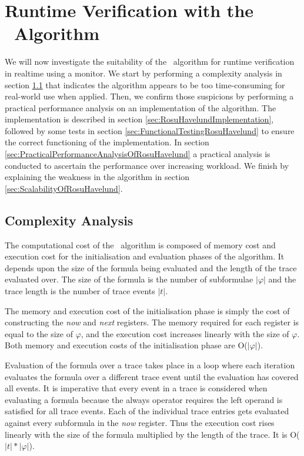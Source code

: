\chapter{Runtime Verification with the \RH\ Algorithm}
\label{chap:Runtime Verification with the Rosu-Havelund Algorithm}

We will now investigate the suitability of the \RH\ algorithm for runtime verification in realtime using a monitor.  We start by performing a complexity analysis in section \ref{sec:ComplexityAnalysis} that indicates the algorithm appears to be too time-consuming for real-world use when applied.  Then, we confirm those suspicions by performing a practical performance analysis on an implementation of the algorithm.  The implementation is described in section \ref{sec:RosuHavelundImplementation}, followed by some tests in section \ref{sec:FunctionalTestingRosuHavelund} to ensure the correct functioning of the implementation.  In section \ref{sec:PracticalPerformanceAnalysisOfRosuHavelund} a practical analysis is conducted to ascertain the performance over increasing workload.  We finish by explaining the weakness in the algorithm in section \ref{sec:ScalabilityOfRosuHavelund}.

\section{Complexity Analysis}
\label{sec:ComplexityAnalysis}

The computational cost of the \RH\ algorithm is composed of memory cost and execution cost for the initialisation and evaluation phases of the algorithm.  It depends upon the size of the formula being evaluated and the length of the trace evaluated over.  The size of the formula is the number of subformulae $ | \varphi | $ and the trace length is the number of trace events $ | t | $.

The memory and execution cost of the initialisation phase is simply the cost of constructing the \textit{now} and \textit{next} registers. The memory required for each register is equal to the size of $ \varphi $, and the execution cost increases linearly with the size of $ \varphi $.  Both memory and execution costs of the initialisation phase are O($ | \varphi | $).

Evaluation of the formula over a trace takes place in a loop where each iteration evaluates the formula over a different trace event until the evaluation has covered all events.  It is imperative that every event in a trace is considered when evaluating a formula because the always operator requires the left operand is satisfied for all trace events.  Each of the individual trace entries gets evaluated against every subformula in the \textit{now} register.  Thus the execution cost rises linearly with the size of the formula multiplied by the length of the trace. It is O($ | t | * | \varphi | $).

